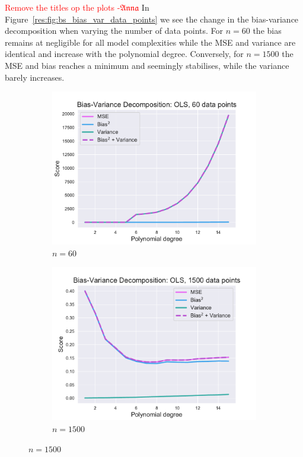 \documentclass[twocolumn,english,notitlepage]{article}
\newcommand{\comment}[1]{\textcolor{red}{#1}}
\newcommand{\Anna}{$\mathfrak{Anna}$}
\begin{document}
            \comment{Remove the titles op the plots -\Anna}
            In Figure~\ref{res:fig:bs_bias_var_data_points} we see the change in the bias-variance decomposition when varying the number of data points. For $n=60$ the bias remains at negligible for all model complexities while the MSE and variance are identical and increase with the polynomial degree. Conversely, for $n=1500$ the MSE and bias reaches a minimum and seemingly stabilises, while the variance barely increases. 
            \begin{figure}[ht]
                \begin{subfigure}{.5\textwidth}
                    \centering
                    \includegraphics[width=.9\linewidth]{BS_Bias_var_decomp_OLS_60_data_points.pdf}
                    \caption{$n=60$}
                    \end{subfigure}
                \begin{subfigure}{.5\textwidth}
                    \centering
                    \includegraphics[width=.9\linewidth]{BS_Bias_var_decomp_OLS_1500_data_points.pdf}
                    \caption{$n=1500$}
                \end{subfigure}
                

\end{figure}
\end{document}
